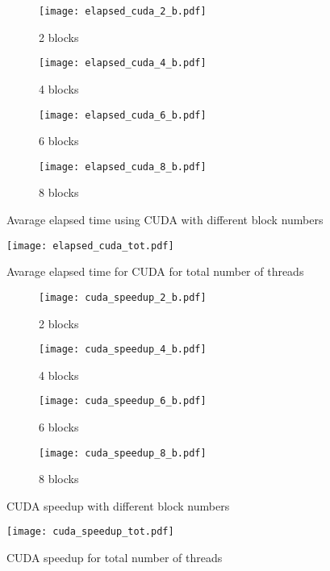 \begin{figure}
	\begin{subfigure}[b]{0.5\textwidth}
	\centering
	\texttt{[image: elapsed\_cuda\_2\_b.pdf]}
	\caption{2 blocks}
	\label{fig:res_cuda_2}
	\end{subfigure}
	\begin{subfigure}[b]{0.5\textwidth}
	\centering
	\texttt{[image: elapsed\_cuda\_4\_b.pdf]}
	\caption{4 blocks}
	\label{fig:res_cuda_4}
	\end{subfigure}
	
	\begin{subfigure}[b]{0.5\textwidth}
	\centering
	\texttt{[image: elapsed\_cuda\_6\_b.pdf]}
	\caption{6 blocks}
	\label{fig:res_cuda_6}
	\end{subfigure}
	\begin{subfigure}[b]{0.5\textwidth}
	\centering
	\texttt{[image: elapsed\_cuda\_8\_b.pdf]}
	\caption{8 blocks}
	\label{fig:res_cuda_8}
	\end{subfigure}	
\caption{Avarage elapsed time using CUDA with different block numbers}
\label{fig:res_cuda}
\end{figure}

\begin{figure}[H]
\centering
\texttt{[image: elapsed\_cuda\_tot.pdf]}
\caption{Avarage elapsed time for CUDA for total number of threads}
\label{fig:res_cuda_tot}
\end{figure}

\begin{figure}
	\begin{subfigure}[b]{0.5\textwidth}
	\centering
	\texttt{[image: cuda\_speedup\_2\_b.pdf]}
	\caption{2 blocks}
	\label{fig:speed_cuda_2}
	\end{subfigure}
	\begin{subfigure}[b]{0.5\textwidth}
	\centering
	\texttt{[image: cuda\_speedup\_4\_b.pdf]}
	\caption{4 blocks}
	\label{fig:speed_cuda_4}
	\end{subfigure}
	
	\begin{subfigure}[b]{0.5\textwidth}
	\centering
	\texttt{[image: cuda\_speedup\_6\_b.pdf]}
	\caption{6 blocks}
	\label{fig:speed_cuda_6}
	\end{subfigure}
	\begin{subfigure}[b]{0.5\textwidth}
	\centering
	\texttt{[image: cuda\_speedup\_8\_b.pdf]}
	\caption{8 blocks}
	\label{fig:speed_cuda_8}
	\end{subfigure}	
\caption{CUDA speedup with different block numbers}
\label{fig:speedup_cuda}
\end{figure}

\begin{figure}[H]
\centering
\texttt{[image: cuda\_speedup\_tot.pdf]}
\caption{CUDA speedup for total number of threads}
\label{fig:speedup_cuda_tot}
\end{figure}

